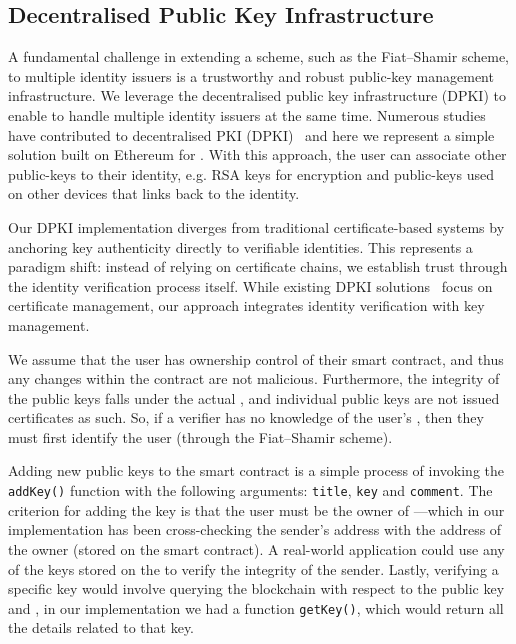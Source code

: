 \subsection{Decentralised Public Key Infrastructure}
\label{sec::chp6::dpki}

A fundamental challenge in extending a scheme, such as the Fiat--Shamir scheme, to multiple identity issuers is a trustworthy and robust public-key management infrastructure. We leverage the decentralised public key infrastructure (DPKI) to enable \deeid to handle multiple identity issuers at the same time. Numerous studies have contributed to decentralised PKI (DPKI)~\cite{kubilay_certledger:_2019, dykcik_blockpki:_2018, yakubov_blockpgp:_2018, patsonakis_practicality_2019} and here we represent a simple solution built on Ethereum for \deeid. With this approach, the user can associate other public-keys to their identity, e.g. RSA keys for encryption and public-keys used on other devices that links back to the identity.

Our DPKI implementation diverges from traditional certificate-based systems by anchoring key authenticity directly to verifiable identities. This represents a paradigm shift: instead of relying on certificate chains, we establish trust through the identity verification process itself. While existing DPKI solutions~\cite{kubilay_certledger:_2019, dykcik_blockpki:_2018, yakubov_blockpgp:_2018, patsonakis_practicality_2019} focus on certificate management, our approach integrates identity verification with key management.

We assume that the user has ownership control of their \deeid smart contract, and thus any changes within the contract are not malicious. Furthermore, the integrity of the public keys falls under the actual \deeid, and individual public keys are not issued certificates as such. So, if a verifier has no knowledge of the user's \deeid, then they must first identify the \deeid user (through the Fiat--Shamir scheme).

Adding new public keys to the smart contract \deeid is a simple process of invoking the \texttt{addKey()} function with the following arguments: \texttt{title}, \texttt{key} and \texttt{comment}. The criterion for adding the key is that the user must be the owner of \deeid---which in our implementation has been cross-checking the sender's address with the address of the owner (stored on the smart contract). A real-world application could use any of the keys stored on the \deeid to verify the integrity of the sender. Lastly, verifying a specific key would involve querying the blockchain with respect to the public key and \deeid, in our implementation we had a function \texttt{getKey()}, which would return all the details related to that key.


